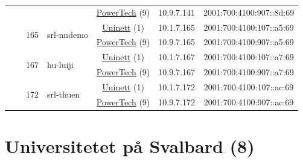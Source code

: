 \begin{small}
\begin{center}
\begin{longtable}{|c|c|c|c|c|c|c|c|}
  &  &  &  & \multicolumn{2}{|c|}{\tiny{\href{http://www.powertech.no}{PowerTech} (9)}} & \tiny{10.9.7.141} & \tiny{2001:700:4100:907::8d:69} \\* \cline{3-3}\cline{4-4}\cline{5-5}\cline{6-6}\cline{7-7}\cline{8-8}
  &  & \multirow{2}{*}{\tiny{165}} & \multicolumn{1}{|l|}{\multirow{2}{*}{\tiny{srl-nndemo}}} & \multicolumn{2}{|c|}{\tiny{\href{https://www.uninett.no}{Uninett} (1)}} & \tiny{10.1.7.165} & \tiny{2001:700:4100:107::a5:69} \\* \cline{5-5}\cline{6-6}\cline{7-7}\cline{8-8}
  &  &  &  & \multicolumn{2}{|c|}{\tiny{\href{http://www.powertech.no}{PowerTech} (9)}} & \tiny{10.9.7.165} & \tiny{2001:700:4100:907::a5:69} \\* \cline{3-3}\cline{4-4}\cline{5-5}\cline{6-6}\cline{7-7}\cline{8-8}
  &  & \multirow{2}{*}{\tiny{167}} & \multicolumn{1}{|l|}{\multirow{2}{*}{\tiny{hu-luiji}}} & \multicolumn{2}{|c|}{\tiny{\href{https://www.uninett.no}{Uninett} (1)}} & \tiny{10.1.7.167} & \tiny{2001:700:4100:107::a7:69} \\* \cline{5-5}\cline{6-6}\cline{7-7}\cline{8-8}
  &  &  &  & \multicolumn{2}{|c|}{\tiny{\href{http://www.powertech.no}{PowerTech} (9)}} & \tiny{10.9.7.167} & \tiny{2001:700:4100:907::a7:69} \\* \cline{3-3}\cline{4-4}\cline{5-5}\cline{6-6}\cline{7-7}\cline{8-8}
  &  & \multirow{2}{*}{\tiny{172}} & \multicolumn{1}{|l|}{\multirow{2}{*}{\tiny{srl-thuen}}} & \multicolumn{2}{|c|}{\tiny{\href{https://www.uninett.no}{Uninett} (1)}} & \tiny{10.1.7.172} & \tiny{2001:700:4100:107::ac:69} \\* \cline{5-5}\cline{6-6}\cline{7-7}\cline{8-8}
  &  &  &  & \multicolumn{2}{|c|}{\tiny{\href{http://www.powertech.no}{PowerTech} (9)}} & \tiny{10.9.7.172} & \tiny{2001:700:4100:907::ac:69} \\ \hline
\end{longtable}
\end{center}
\end{small}



\section{Universitetet på Svalbard (8)}
\label{sec:UNIS}

